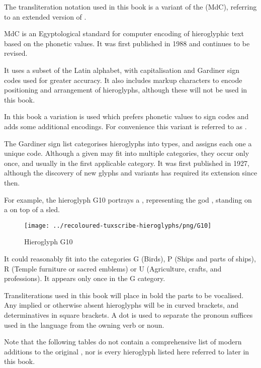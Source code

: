 The transliteration notation used in this book is a variant of the \textit{} (MdC), referring to an extended version of \textit{}.

MdC is an Egyptological standard for computer encoding of hieroglyphic text based on the phonetic values. It was first published in 1988 and continues to be revised.

It uses a subset of the Latin alphabet, with capitalisation and Gardiner sign codes used for greater accuracy. It also includes markup characters to encode positioning and arrangement of hieroglyphs, although these will not be used in this book.

In this book a variation is used which prefers phonetic values to sign codes and adds some additional encodings. For convenience this variant is referred to as .

The Gardiner sign list categorises hieroglyphs into types, and assigns each one a unique code. Although a given  may fit into multiple categories, they occur only once, and usually in the first applicable category. It was first published in 1927, although the discovery of new glyphs and variants has required its extension since then.

For example, the hieroglyph G10 portrays a , representing the god , standing on a  on top of a sled.

\begin{figure} [H]
\centering
\texttt{[image: ../recoloured-tuxscribe-hieroglyphs/png/G10]}
\caption{Hieroglyph G10}
\end{figure}

It could reasonably fit into the categories G (Birds), P (Ships and parts of ships), R (Temple furniture or sacred emblems) or U (Agriculture, crafts, and professions). It appears only once in the G category.

Transliterations used in this book will place in bold the parts to be vocalised. Any implied or otherwise absent hieroglyphs will be in curved brackets, and determinatives in square brackets. A dot is used to separate the pronoun suffices used in the language from the owning verb or noun.

Note that the following tables do not contain a comprehensive list of modern additions to the original , nor is every hieroglyph listed here referred to later in this book.

